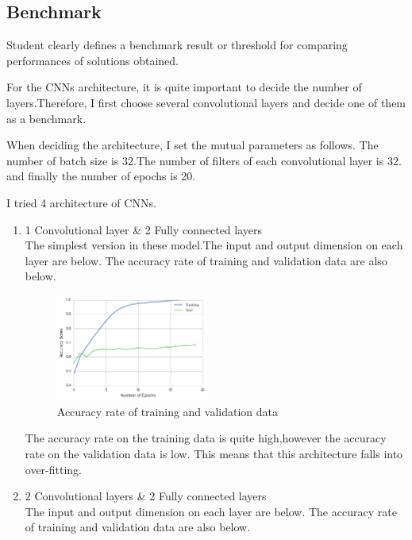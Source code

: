 \subsection{Benchmark}
Student clearly defines a benchmark result or threshold for comparing performances of solutions obtained.

For the CNNs architecture, it is quite important to decide the number of layers.Therefore, I first choose several convolutional layers and decide one of them as a benchmark.

When deciding the architecture, I set the mutual parameters as follows.
The number of batch size is 32.The number of filters of each convolutional layer is 32. and finally the number of epochs is 20.

I tried 4 architecture of CNNs.

\begin{enumerate}
 \item 1 Convolutional layer \& 2 Fully connected layers \\
 The simplest version in these model.The input and output dimension on each layer are below.
 The accuracy rate of training and validation data are also below.
 
 \begin{figure}[H]

	\begin{center}
	\includegraphics[width=5cm]{picture/1layer_cnn.png}
	\caption{Accuracy rate of training and validation data}
	\end{center}
	\label{fig:eight}

\end{figure}
 
 The accuracy rate on the training data is quite high,however the accuracy rate on the validation data is low. This means that this architecture falls into over-fitting.
 
 
 \item 2 Convolutional layers \& 2 Fully connected layers \\
 The input and output dimension on each layer are below.
 The accuracy rate of training and validation data are also below.
 

\end{enumerate}
